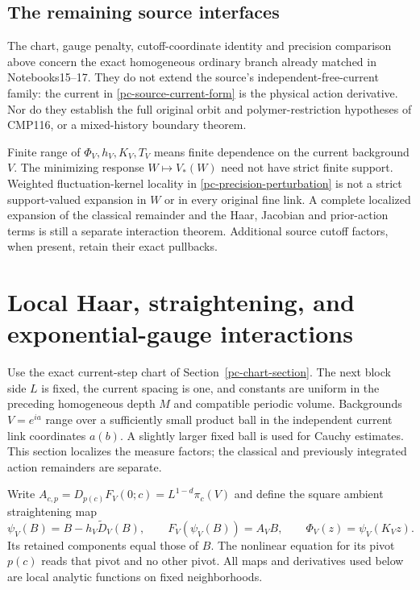 \documentclass[11pt]{article}
\begin{document}
\subsection{The remaining source interfaces}
\label{pc-scope}

The chart, gauge penalty, cutoff-coordinate identity and
precision comparison above concern the exact homogeneous
ordinary branch already matched in Notebooks15--17. They
do not extend the source's independent-free-current family:
the current in \eqref{pc-source-current-form} is the physical
action derivative. Nor do they establish the full original
orbit and polymer-restriction hypotheses of CMP116, or a
mixed-history boundary theorem.

Finite range of $\Phi_V,h_V,K_V,T_V$ means finite dependence
on the current background $V$. The minimizing response
$W\mapsto V_*(W)$ need not have strict finite support.
Weighted fluctuation-kernel locality in
\eqref{pc-precision-perturbation} is not a strict
support-valued expansion in $W$ or in every original fine
link. A complete localized expansion of the classical
remainder and the Haar, Jacobian and prior-action terms is
still a separate interaction theorem. Additional source
cutoff factors, when present, retain their exact pullbacks.
\section{Local Haar, straightening, and exponential-gauge interactions}
\label{pm-section}

Use the exact current-step chart of Section~\ref{pc-chart-section}.
The next block side $L$ is fixed, the current spacing is one,
and constants are uniform in the preceding homogeneous depth $M$
and compatible periodic volume. Backgrounds $V=e^{ia}$ range
over a sufficiently small product ball in the independent
current link coordinates $a(b)$. A slightly larger fixed ball
is used for Cauchy estimates. This section localizes the measure
factors; the classical and previously integrated action
remainders are separate.

Write $A_{c,p}=D_{p(c)}F_V(0;c)=L^{1-d}\pi_c(V)$ and define
the square ambient straightening map
\begin{equation}\label{pm-ambient-map}
 \psi_V(B)=B-h_V\widetilde D_V(B),\qquad
 F_V(\psi_V(B))=A_VB,\qquad
 \Phi_V(z)=\psi_V(K_Vz).
\end{equation}
Its retained components equal those of $B$. The nonlinear
equation for its pivot $p(c)$ reads that pivot and no other
pivot. All maps and derivatives used below are local analytic
functions on fixed neighborhoods.
\end{document}

